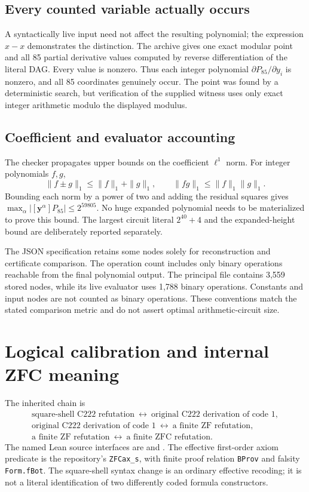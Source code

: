 \documentclass[11pt]{article}
\theoremstyle{definition}\newtheorem{definition}[theorem]{Definition}
\theoremstyle{remark}\newtheorem{remark}[theorem]{Remark}
\begin{document}
\subsection{Every counted variable actually occurs}
A syntactically live input need not affect the resulting polynomial;
the expression $x-x$ demonstrates the distinction. The archive gives
one exact modular point and all 85 partial derivative values computed
by reverse differentiation of the literal DAG. Every value is nonzero.
Thus each integer polynomial $\partial P_{85}/\partial y_i$ is
nonzero, and all 85 coordinates genuinely occur. The point was found
by a deterministic search, but verification of the supplied witness
uses only exact integer arithmetic modulo the displayed modulus.

\subsection{Coefficient and evaluator accounting}
The checker propagates upper bounds on the coefficient $\ell^1$ norm.
For integer polynomials $f,g$,
\[
 \|f\pm g\|_1\leq\|f\|_1+\|g\|_1,
 \qquad\|fg\|_1\leq\|f\|_1\|g\|_1.
\]
Bounding each norm by a power of two and adding the residual squares
gives $\max_\alpha|[\boldsymbol y^\alpha]P_{85}|\leq2^{59805}$.
No huge expanded polynomial needs to be materialized to prove this
bound. The largest circuit literal $2^{40}+4$ and the expanded-height
bound are deliberately reported separately.

The JSON specification retains some nodes solely for reconstruction
and certificate comparison. The operation count includes only binary
operations reachable from the final polynomial output. The principal
file contains 3,559 stored nodes, while its live evaluator uses 1,788
binary operations. Constants and input nodes are not counted as
binary operations. These conventions match the stated comparison
metric and do not assert optimal arithmetic-circuit size.

\section{Logical calibration and internal ZFC meaning}
\label{sec:logic}

The inherited chain is
\[
 \begin{gathered}
 \text{square-shell C222 refutation}
 \ \longleftrightarrow\ \text{original C222 derivation of code 1},\\
 \text{original C222 derivation of code 1}
 \ \longleftrightarrow\ \text{a finite ZF refutation},\\
 \text{a finite ZF refutation}
 \ \longleftrightarrow\ \text{a finite ZFC refutation}.
 \end{gathered}
\]
The named Lean source interfaces are
 and
.
The effective first-order axiom predicate is the repository's
\texttt{ZFCax\_s}, with finite proof relation \texttt{BProv} and
falsity \texttt{Form.fBot}. The square-shell syntax change is an
ordinary effective recoding; it is not a literal identification of
two differently coded formula constructors.
\end{document}
